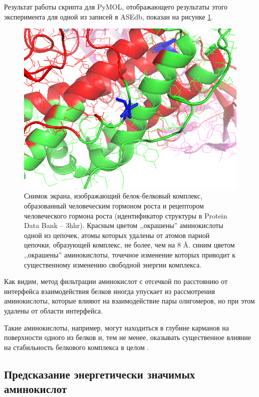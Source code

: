 Результат работы скрипта для PyMOL, отображающего результаты этого эксперимента для одной из записей в ASEdb, показан на  рисунке \ref{fig:image7}.


\begin{figure}
\includegraphics[width=\linewidth]{image7.png}

\caption{\small{Снимок экрана, изображающий
белок-белковый комплекс, образованный  человеческим гормоном роста и рецептором человеческого гормона роста (идентификатор структуры в Protein Data Bank -- 3hhr). Красным цветом ,,окрашены'' аминокислоты одной из цепочек, атомы которых удалены от атомов парной цепочки, образующей  комплекс, не более, чем на 8 \AA{}. синим цветом ,,окрашены'' аминокислоты, точечное изменение которых приводит к существенному изменению свободной энергии комплекса.  }}
\label{fig:image7}
\end{figure}

Как видим, метод фильтрации аминокислот с отсечкой по расстоянию от интерфейса взаимодействия белков иногда упускает из рассмотрения аминокислоты, которые влияют на взаимодействие пары олигомеров, но при этом удалены от области интерфейса.

Такие аминокислоты, например, могут находиться в глубине карманов на поверхности одного из белков и, тем не менее, оказывать существенное влияние на стабильность белкового комплекса в целом \cite{pockets2004}.

\subsection{Предсказание энергетически значимых аминокислот}

